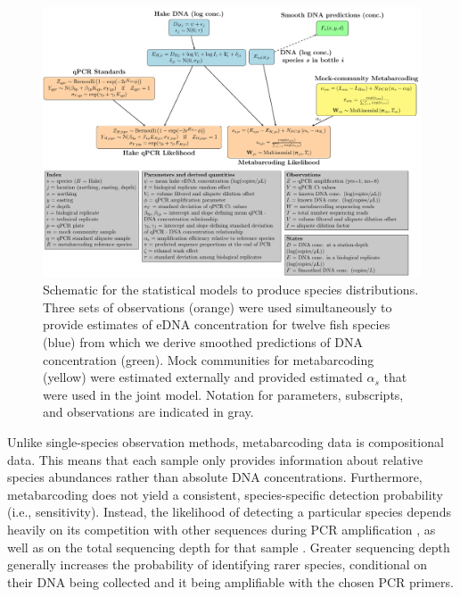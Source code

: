 \documentclass{article}
\begin{document}
\begin{figure}[tbhp] 
\centering
\includegraphics[width=16cm]{plots/DAG_v3.pdf} 
\caption{Schematic for the statistical models to produce species distributions. Three sets of observations (orange) were used simultaneously to provide estimates of eDNA concentration for  twelve fish species (blue) from which we derive smoothed predictions of DNA concentration (green). Mock communities for metabarcoding (yellow) were estimated externally and provided estimated $\alpha_s$ that were used in the joint model. Notation for parameters, subscripts, and observations are indicated in gray.}
\label{fig:DAG_v3}
\end{figure}

Unlike single-species observation methods, metabarcoding data is compositional data. This means that each sample only provides information about relative species abundances rather than absolute DNA concentrations. Furthermore, metabarcoding does not yield a consistent, species-specific detection probability (i.e., sensitivity). Instead, the likelihood of detecting a particular species depends heavily on its competition with other sequences during PCR amplification \cite{shelton2023}, as well as on the total sequencing depth for that sample \cite{kelly2019}. Greater sequencing depth generally increases the probability of identifying rarer species, conditional on their DNA being collected and it being amplifiable with the chosen PCR primers.
\end{document}
